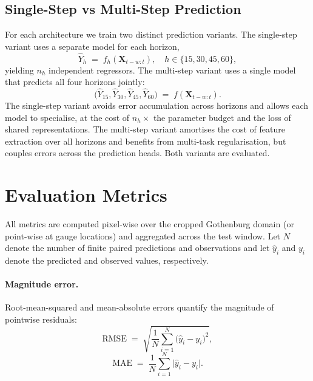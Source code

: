 \documentclass[12pt, a4paper]{article}
\begin{document}
\subsection{Single-Step vs Multi-Step Prediction}\label{sec:singlemulti}

For each architecture we train two distinct prediction variants. The
single-step variant uses a separate model for each horizon,
\begin{equation}
  \hat{Y}_{h} \;=\; f_{h}\!\left(\mathbf{X}_{t-w:t}\right),
  \quad h \in \{15, 30, 45, 60\}, \label{eq:single}
\end{equation}
yielding \(n_h\) independent regressors. The multi-step variant uses a
single model that predicts all four horizons jointly:
\begin{equation}
  \bigl(\hat{Y}_{15}, \hat{Y}_{30}, \hat{Y}_{45}, \hat{Y}_{60}\bigr) \;=\; f\!\left(\mathbf{X}_{t-w:t}\right). \label{eq:multi}
\end{equation}
The single-step variant avoids error accumulation across horizons and
allows each model to specialise, at the cost of \(n_h\times\) the
parameter budget and the loss of shared representations. The
multi-step variant amortises the cost of feature extraction over all
horizons and benefits from multi-task regularisation, but couples
errors across the prediction heads. Both variants are evaluated.

\section{Evaluation Metrics}\label{sec:metrics}

All metrics are computed pixel-wise over the cropped Gothenburg domain
(or point-wise at gauge locations) and aggregated across the test
window. Let \(N\) denote the number of finite paired predictions and
observations and let \(\hat{y}_i\) and \(y_i\) denote the predicted and
observed values, respectively.

\paragraph{Magnitude error.} Root-mean-squared and mean-absolute
errors quantify the magnitude of pointwise residuals:
\begin{equation}
  \mathrm{RMSE} \;=\;
  \sqrt{\frac{1}{N}\sum_{i=1}^{N}\bigl(\hat{y}_i - y_i\bigr)^{2}}, \label{eq:rmse}
\end{equation}
\begin{equation}
  \mathrm{MAE} \;=\;
  \frac{1}{N}\sum_{i=1}^{N}\bigl|\hat{y}_i - y_i\bigr|. \label{eq:mae}
\end{equation}
\end{document}
